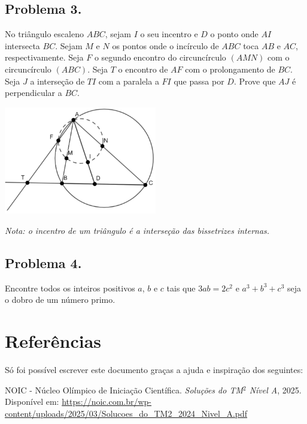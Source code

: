 \documentclass[12pt]{article}
\begin{document}
    \subsection{Problema 3.}
      \begin{tcolorbox}[problembox={Enunciado do problema}]
        No triângulo escaleno $ABC$, sejam $I$ o seu incentro e $D$ o ponto onde $AI$
        intersecta $BC$. Sejam $M$ e $N$ os pontos onde o incírculo de $ABC$ toca $AB$
        e $AC$, respectivamente. Seja $F$ o segundo encontro do circuncírculo $(AMN)$
        com o circuncírculo $(ABC)$. Seja $T$ o encontro de $AF$ com o prolongamento
        de $BC$. Seja $J$ a interseção de $TI$ com a paralela a $FI$ que passa por $D$.
        Prove que $AJ$ é perpendicular a $BC$.

        \centering
          \includegraphics[width=0.5\textwidth]{third.png}

        \textit{Nota: o incentro de um triângulo é a interseção das bissetrizes internas.}
      \end{tcolorbox}

    \clearpage

    \subsection{Problema 4.}
      \begin{tcolorbox}[problembox={Enunciado do problema}]
        Encontre todos os inteiros positivos $a$, $b$ e $c$ tais que $3ab = 2c^2$
        e $ a^3 + b^3 + c^3$ seja o dobro de um número primo.
      \end{tcolorbox}

  \clearpage
  
  \section{\textsf{Referências}}
  Só foi possível escrever este documento graças a ajuda e inspiração dos seguintes:

  \renewcommand{\refname}{\vspace{-2em}}
  \begin{thebibliography}{9}
    NOIC - Núcleo Olímpico de Iniciação Científica.
    \textit{Soluções do TM$^2$ Nível A}, 2025.
    Disponível em: \url{https://noic.com.br/wp-content/uploads/2025/03/Solucoes_do_TM2_2024_Nivel_A.pdf}
  \end{thebibliography}
\end{document}

